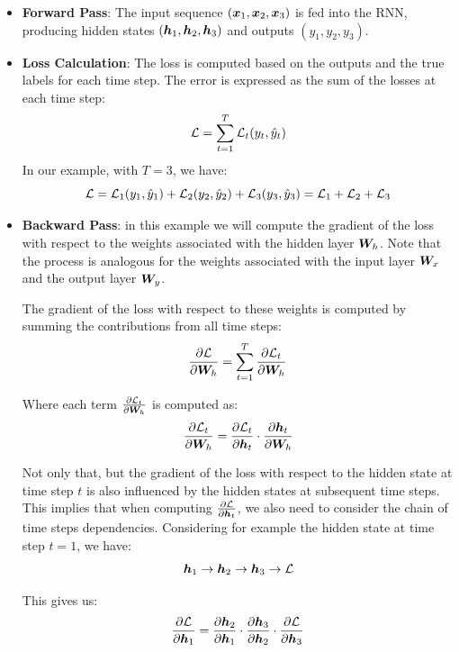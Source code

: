 \begin{itemize}
    \item \textbf{Forward Pass}: The input sequence $(\boldsymbol{x}_1, \boldsymbol{x}_2, \boldsymbol{x}_3)$ is fed into the RNN, producing hidden states $(\boldsymbol{h}_1, \boldsymbol{h}_2, \boldsymbol{h}_3)$ and outputs $(y_1, y_2, y_3)$.
    \item \textbf{Loss Calculation}: The loss is computed based on the outputs and the true labels for each time step.
    The error is expressed as the sum of the losses at each time step:
    \begin{equation}
        \mathcal{L} = \sum_{t=1}^{T} \mathcal{L}_t(y_t, \hat{y}_t)
    \end{equation}
    In our example, with $T=3$, we have:
    \begin{equation}
        \mathcal{L} = \mathcal{L}_1(y_1, \hat{y}_1) + \mathcal{L}_2(y_2, \hat{y}_2) + \mathcal{L}_3(y_3, \hat{y}_3) = \mathcal{L}_1 + \mathcal{L}_2 + \mathcal{L}_3
    \end{equation}
    \item \textbf{Backward Pass}: in this example we will compute the gradient of the loss with respect to the weights associated with the hidden layer $\boldsymbol{W}_h$.
    Note that the process is analogous for the weights associated with the input layer $\boldsymbol{W}_x$ and the output layer $\boldsymbol{W}_y$.

    The gradient of the loss with respect to these weights is computed by summing the contributions from all time steps:
    \begin{equation}
        \frac{\partial \mathcal{L}}{\partial \boldsymbol{W}_h} = \sum_{t=1}^{T} \frac{\partial \mathcal{L}_t}{\partial \boldsymbol{W}_h}
    \end{equation}

    Where each term $\frac{\partial \mathcal{L}_t}{\partial \boldsymbol{W}_h}$ is computed as:
    \begin{equation}
        \frac{\partial \mathcal{L}_t}{\partial \boldsymbol{W}_h} = \frac{\partial \mathcal{L}_t}{\partial \boldsymbol{h}_t} \cdot \frac{\partial \boldsymbol{h}_t}{\partial \boldsymbol{W}_h}
    \end{equation}

    Not only that, but the gradient of the loss with respect to the hidden state at time step $t$ is also influenced by the hidden states at subsequent time steps.
    This implies that when computing $\frac{\partial \mathcal{L}}{\partial \boldsymbol{h}_t}$, we also need to consider the chain of time steps dependencies.
    Considering for example the hidden state at time step $t=1$, we have:
    \begin{equation}
        \boldsymbol{h}_1 \rightarrow \boldsymbol{h}_2 \rightarrow \boldsymbol{h}_3 \rightarrow \mathcal{L}
    \end{equation}


    This gives us:
    \begin{equation}
        \frac{\partial \mathcal{L}}{\partial \boldsymbol{h}_1} =  \frac{\partial \boldsymbol{h}_2}{\partial \boldsymbol{h}_1} \cdot \frac{\partial \boldsymbol{h}_3}{\partial \boldsymbol{h}_2} \cdot \frac{\partial \mathcal{L}}{\partial \boldsymbol{h}_3}
    \end{equation}

\end{itemize}


